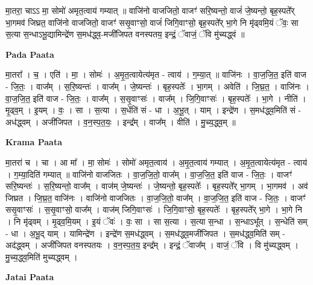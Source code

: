 \documentclass[17pt]{extarticle}
\begin{document}
मा॒तरा॒ चाऽऽ मा॒ सोमो॑ अमृत॒त्वाय॑ गम्यात् ॥ वाजि॑नो वाजजितो॒ वाजꣳ॑ सरि॒ष्यन्तो॒ वाजं॑ जे॒ष्यन्तो॒ बृह॒स्पते᳚र् भा॒गमव॑ जिघ्रत॒ वाजि॑नो वाजजितो॒ वाजꣳ॑ ससृ॒वाꣳसो॒ वाजं॑ जिगि॒वाꣳसो॒ बृह॒स्पते᳚र् भा॒गे नि मृ॑ढ्वमि॒यं ॅवः॒ सा स॒त्या स॒न्धाऽभू॒द्यामिन्द्रे॑ण स॒मध॑द्ध्व॒-मजी॑जिपत वनस्पतय॒ इन्द्रं॒ ॅवाजं॒ ॅवि मु॑च्यद्ध्वं ॥ \newline

\textbf{Pada Paata} \newline

मा॒तरा᳚ । च॒ । एति॑ । मा॒ । सोमः॑ । अ॒मृ॒त॒त्वायेत्य॑मृत - त्वाय॑ । ग॒म्या॒त् ॥ वाजि॑नः । वा॒ज॒जि॒त॒ इति॑ वाज - जि॒तः॒ । वाज᳚म् । स॒रि॒ष्यन्तः॑ । वाज᳚म् । जे॒ष्यन्तः॑ । बृह॒स्पतेः᳚ । भा॒गम् । अवेति॑ । जि॒घ्र॒त॒ । वाजि॑नः । वा॒ज॒जि॒त॒ इति॑ वाज - जि॒तः॒ । वाज᳚म् । स॒सृ॒वाꣳसः॑ । वाज᳚म् । जि॒गि॒वाꣳसः॑ । बृह॒स्पतेः᳚ । भा॒गे । नीति॑ । मृ॒ढ्व॒म् । इ॒यम् । वः॒ । सा । स॒त्या । स॒धेंति॑ सं - धा । अ॒भू॒त् । याम् । इन्द्रे॑ण । स॒मध॑द्ध्व॒मिति॑ सं - अध॑द्ध्वम् । अजी॑जिपत । व॒न॒स्प॒त॒यः॒ । इन्द्र᳚म् । वाज᳚म् । वीति॑ । मु॒च्य॒द्ध्व॒म् ॥  \newline


\textbf{Krama Paata} \newline

मा॒तरा॑ च । चा । आ मा᳚ । मा॒ सोमः॑ । सोमो॑ अमृत॒त्वाय॑ । अ॒मृ॒त॒त्वाय॑ गम्यात् । अ॒मृ॒त॒त्वायेत्य॑मृत - त्वाय॑ । ग॒म्या॒दिति॑ गम्यात् ॥ वाजि॑नो वाजजितः । वा॒ज॒जि॒तो॒ वाज᳚म् । वा॒ज॒जि॒त॒ इति॑ वाज - जि॒तः॒ । वाजꣳ॑ सरि॒ष्यन्तः॑ । स॒रि॒ष्यन्तो॒ वाज᳚म् । वाज॑म् जे॒ष्यन्तः॑ । जे॒ष्यन्तो॒ बृह॒स्पतेः᳚ । बृह॒स्पते᳚र् भा॒गम् । भा॒गमव॑ । अव॑ जिघ्रत । जि॒घ्र॒त॒ वाजि॑नः । वाजि॑नो वाजजितः । वा॒ज॒जि॒तो॒ वाज᳚म् । वा॒ज॒जि॒त॒ इति॑ वाज - जि॒तः॒ । वाजꣳ॑ ससृ॒वाꣳसः॑ । स॒सृ॒वाꣳसो॒ वाज᳚म् । वाज॑म् जिगि॒वाꣳसः॑ । जि॒गि॒वाꣳसो॒ बृह॒स्पतेः᳚ । बृह॒स्पते᳚र् भा॒गे । भा॒गे नि । नि मृ॑ढ्वम् । मृ॒ढ्व॒मि॒यम् । इ॒यं ॅवः॑ । वः॒ सा । सा स॒त्या । स॒त्या स॒न्धा । स॒न्धाऽभू᳚त् । स॒न्धेति॑ सम् - धा । अ॒भू॒द् याम् । यामिन्द्रे॑ण । इन्द्रे॑ण स॒मध॑द्ध्वम् । स॒मध॑द्ध्व॒मजी॑जिपत । स॒मध॑द्ध्व॒मिति॑ सम् - अद॑द्ध्वम् । अजी॑जिपत वनस्पतयः । व॒न॒स्प॒त॒य॒ इन्द्र᳚म् । इन्द्रं॒ ॅवाज᳚म् । वाजं॒ ॅवि । वि मु॑च्यद्ध्वम् । मु॒च्य॒द्ध्व॒मिति॑ मुच्यद्ध्वम् । \newline

\textbf{Jatai Paata} \newline
\end{document}
